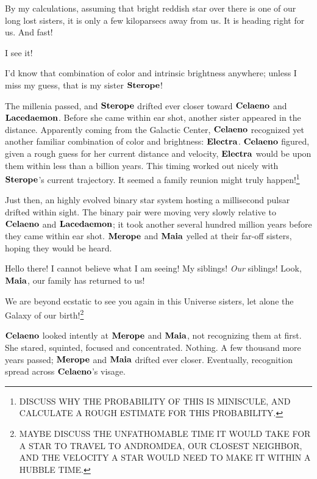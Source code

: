 \documentclass[main.tex]{subfiles}
\begin{document}
\par \Celaeno  By my calculations, assuming that bright reddish star over there is one of our long lost sisters, it is only a few kiloparsecs away from us.  It is heading right for us.  And fast!  

\par \Lacedaemon I see it!

\par \Celaeno I'd know that combination of color and intrinsic brightness anywhere; unless I miss my guess, that is my sister $\Sterope$!  

\par \nar The millenia passed, and $\Sterope$ drifted ever closer toward $\Celaeno$ and $\Lacedaemon$.  Before she came within ear shot, another sister appeared in the distance.  Apparently coming from the Galactic Center, $\Celaeno$ recognized yet another familiar combination of color and brightness:  $\Electra$.  $\Celaeno$ figured, given a rough guess for her current distance and velocity, $\Electra$ would be upon them within less than a billion years.  This timing worked out nicely with $\Sterope$'s current trajectory.  It seemed a family reunion might truly happen!\footnote{DISCUSS WHY THE PROBABILITY OF THIS IS MINISCULE, AND CALCULATE A ROUGH ESTIMATE FOR THIS PROBABILITY.}

\par \nar Just then, an highly evolved binary star system hosting a millisecond pulsar drifted within sight.  The binary pair were moving very slowly relative to $\Celaeno$ and $\Lacedaemon$; it took another several hundred million years before they came within ear shot.  $\Merope$ and $\Maia$ yelled at their far-off sisters, hoping they would be heard.

\par \Merope Hello there!  I cannot believe what I am seeing!  My siblings!  \textit{Our} siblings!  Look, $\Maia$, our family has returned to us!  

\par \Maia We are beyond ecstatic to see you again in this Universe sisters, let alone the Galaxy of our birth!\footnote{MAYBE DISCUSS THE UNFATHOMABLE TIME IT WOULD TAKE FOR A STAR TO TRAVEL TO ANDROMDEA, OUR CLOSEST NEIGHBOR, AND THE VELOCITY A STAR WOULD NEED TO MAKE IT WITHIN A HUBBLE TIME.}

\par \nar $\Celaeno$ looked intently at $\Merope$ and $\Maia$, not recognizing them at first.  She stared, squinted, focused and concentrated.  Nothing.  A few thousand more years passed; $\Merope$ and $\Maia$ drifted ever closer.  Eventually, recognition spread across $\Celaeno$'s visage.
\end{document}
